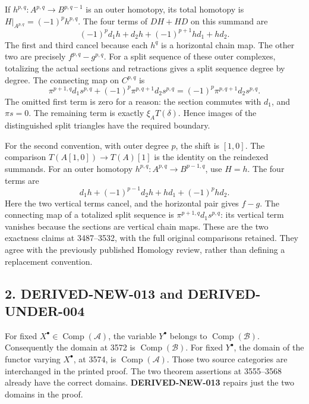 If \(h^{p,q}:A^{p,q}\to B^{p,q-1}\) is an outer homotopy,\allowbreak{} its total homotopy is \(H|_{A^{p,q}}=(-1)^ph^{p,q}\). The four terms of \(DH+HD\) on this summand are \[
(-1)^pd_1h+d_2h+(-1)^{p+1}hd_1+hd_2.
\] The first and third cancel because each \(h^q\) is a horizontal chain map. The other two are precisely \(f^{p,q}-g^{p,q}\). For a split sequence of these outer complexes,\allowbreak{} totalizing the actual sections and retractions gives a split sequence degree by degree. The connecting map on \(C^{p,q}\) is \[
\pi^{p+1,q}d_1s^{p,q}
+(-1)^p\pi^{p,q+1}d_2s^{p,q}
=(-1)^p\pi^{p,q+1}d_2s^{p,q}.
\] The omitted first term is zero for a reason:\allowbreak{} the section commutes with \(d_1\),\allowbreak{} and \(\pi s=0\). The remaining term is exactly \(\xi_A T(\delta)\). Hence images of the distinguished split triangles have the required boundary.

For the second convention,\allowbreak{} with outer degree \(p\),\allowbreak{} the shift is \([1,0]\). The comparison \(T(A[1,0])\to T(A)[1]\) is the identity on the reindexed summands. For an outer homotopy \(h^{p,q}:A^{p,q}\to B^{p-1,q}\),\allowbreak{} use \(H=h\). The four terms are \[
d_1h+(-1)^{p-1}d_2h+hd_1+(-1)^phd_2.
\] Here the two vertical terms cancel,\allowbreak{} and the horizontal pair gives \(f-g\). The connecting map of a totalized split sequence is \(\pi^{p+1,q}d_1s^{p,q}\):\allowbreak{} its vertical term vanishes because the sections are vertical chain maps. These are the two exactness claims at 3487–\allowbreak{}3532,\allowbreak{} with the full original comparisons retained. They agree with the previously published Homology review,\allowbreak{} rather than defining a replacement convention.

\subsection{2. DERIVED-NEW-013 and DERIVED-UNDER-004}\label{proofs-3487-4161-derived-new-013-and-derived-under-004}

For fixed \(X^\bullet\in\operatorname{Comp}(\mathcal A)\),\allowbreak{} the variable \(Y^\bullet\) belongs to \(\operatorname{Comp}(\mathcal B)\). Consequently the domain at 3572 is \(\operatorname{Comp}(\mathcal B)\). For fixed \(Y^\bullet\),\allowbreak{} the domain of the functor varying \(X^\bullet\),\allowbreak{} at 3574,\allowbreak{} is \(\operatorname{Comp}(\mathcal A)\). Those two source categories are interchanged in the printed proof. The two theorem assertions at 3555–\allowbreak{}3568 already have the correct domains. \textbf{DERIVED-NEW-013} repairs just the two domains in the proof.

